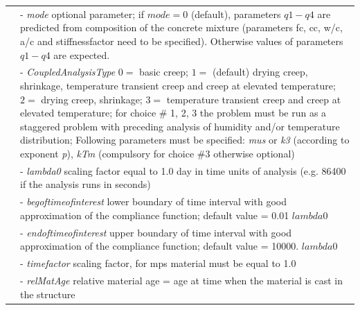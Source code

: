 \documentclass[a4paper]{article}
\newcommand{\param}[1]{{\it #1}}
\newenvironment{mmt}{\begin{tabular}{|l|p{9cm}|}}{\end{tabular}\\}
\newenvironment{mmt}{\begin{tabular}{|l|l|}}{\end{tabular}\\}
\begin{document}
\begin{table}[!htb]
\begin{mmt}
&- \param{mode} optional parameter; if $mode = 0$ (default),  parameters $q1-q4$ are predicted from composition of the concrete mixture (parameters fc, cc, w/c, a/c and stiffnessfactor need to be specified). Otherwise values of parameters $q1-q4$ are expected.\\
&- \param{CoupledAnalysisType} $0=$ basic creep; $1=$ (default) drying creep, shrinkage, temperature transient creep and creep at elevated temperature; $2=$ drying creep, shrinkage; $3=$ temperature transient creep and creep at elevated temperature; for choice \# 1, 2, 3 the problem must be run as a staggered problem with preceding analysis of humidity and/or temperature distribution; 
Following parameters must be specified: %
\param{mus} or \param{k3} (according to exponent \param{p}), \param{kTm} (compulsory for choice \#3 otherwise optional)\\
%
&- \param{lambda0} scaling factor equal to 1.0 day in time units of analysis (e.g. 86400 if the analysis runs in seconds)\\
&- \param{begoftimeofinterest} lower boundary of time interval with good approximation of the compliance function; default value = 0.01 $lambda0$\\  
&- \param{endoftimeofinterest} upper boundary of time interval with good approximation of the compliance function; default value = 10000. $lambda0$\\  
&- \param{timefactor} scaling factor, for mps material must be equal to 1.0\\
&- \param{relMatAge} relative material age = age at time when the material is
cast in the structure \\
%
\hline
\end{mmt}
\end{table}
\end{document}
